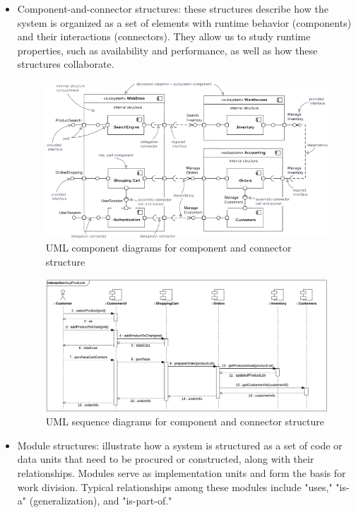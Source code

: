 \documentclass[12pt, a4paper]{report}
\begin{document}
        \begin{itemize}
            \item Component-and-connector structures: these structures describe how the system is organized as a set of elements with runtime behavior (components) and their interactions (connectors). 
                They allow us to study runtime properties, such as availability and performance, as well as how these structures collaborate.
                \begin{figure}[H]
                    \centering
                    \includegraphics[width=0.75\linewidth]{images/component1.png}
                    \caption{UML component diagrams for component and connector structure}
                \end{figure}
                \begin{figure}[H]
                    \centering
                    \includegraphics[width=0.75\linewidth]{images/component2.png}
                    \caption{UML sequence diagrams for component and connector structure}
                \end{figure}
            \item Module structures: illustrate how a system is structured as a set of code or data units that need to be procured or constructed, along with their relationships. 
                Modules serve as implementation units and form the basis for work division.
                Typical relationships among these modules include "uses," "is-a" (generalization), and "is-part-of."

\end{itemize}
\end{document}

